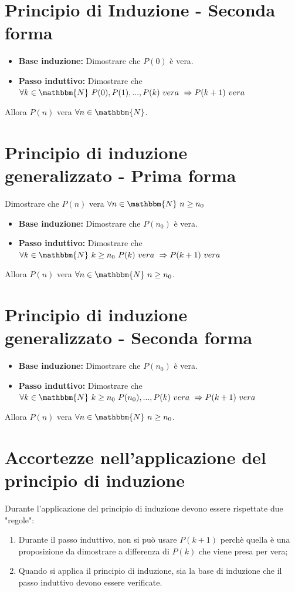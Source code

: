 \documentclass[12pt, letterpaper]{report}
\begin{document}
		\section{Principio di Induzione - Seconda forma}
		\begin{itemize}
			\item \textbf{Base induzione:} Dimostrare che $P(0)$ è vera.
			\item \textbf{Passo induttivo:} Dimostrare che $\forall k \in \mathbbm{N} \ P(0), P(1),...,P(k)\ vera \ \Rightarrow P(k + 1) \ vera$
		\end{itemize}
		Allora $P(n)$ vera $\forall n \in \mathbbm{N}$.
		\section{Principio di induzione generalizzato - Prima forma}
		Dimostrare che $P(n)$ vera $\forall n \in \mathbbm{N} \ n \geq n_0$
		\begin{itemize}
			\item \textbf{Base induzione:} Dimostrare che $P(n_0)$ è vera.
			\item \textbf{Passo induttivo:} Dimostrare che $\forall k \in \mathbbm{N} \ k \geq n_0 \ P(k)\ vera \ \Rightarrow P(k + 1) \ vera$
		\end{itemize}
		Allora $P(n)$ vera $\forall n \in \mathbbm{N} \ n \geq n_0$.
		\section{Principio di induzione generalizzato - Seconda forma}
		\begin{itemize}
			\item \textbf{Base induzione:} Dimostrare che $P(n_0)$ è vera.
			\item \textbf{Passo induttivo:} Dimostrare che $\forall k \in \mathbbm{N} \ k \geq n_0 \ P(n_0),...,P(k)\ vera \ \Rightarrow P(k + 1) \ vera$
		\end{itemize}
		Allora $P(n)$ vera $\forall n \in \mathbbm{N} \ n \geq n_0$.
		\section{Accortezze nell'applicazione del principio di induzione}
		Durante l'applicazione del principio di induzione devono essere rispettate due "regole":
		\begin{enumerate}
			\item Durante il passo induttivo, non si può usare $P(k + 1)$ perchè quella è una proposizione da dimostrare a differenza di $P(k)$ che viene presa per vera;
			\item Quando si applica il principio di induzione, sia la base di induzione che il passo induttivo devono essere verificate.
		\end{enumerate}
\end{document}
